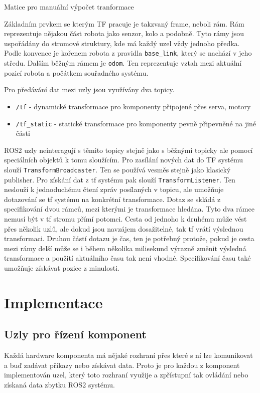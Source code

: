 \begin{center}
Matice pro manuální výpočet tranformace
\end{center}

Základním prvkem se kterým TF pracuje je takzvaný frame, neboli rám. Rám reprezentuje nějakou část robota jako senzor, kolo a podobně. Tyto rámy jsou uspořádány do stromové struktury, kde má každý uzel vždy jednoho předka. Podle konvence je kořenem robota z pravidla \verb|base_link|, který se nachází v jeho středu. Dalším běžným rámem je \verb|odom|. Ten reprezentuje vztah mezi aktuální pozicí robota a počátkem souřadného systému.

Pro předávání dat mezi uzly jsou využívány dva topicy.
\begin{itemize}
	\item {\verb|/tf| - dynamické transformace pro komponenty připojené přes serva, motory}
	\item {\verb|/tf_static| - statické transformace pro komponenty pevně připevněné na jiné části}
\end{itemize} 
ROS2 uzly neinteragují s těmito topicy stejně jako s běžnými topicky ale pomocí speciálních objektů k tomu sloužícím. Pro zasílání nových dat do TF systému slouží \verb|TransformBroadcaster|. Ten se používá vesměs stejně jako klasický publisher.
Pro získání dat z tf systému pak slouží \verb|TransformListener|. Ten neslouží k jednoduchému čtení zpráv posílaných v topicu, ale umožňuje dotazování se tf systému na konkrétní transformace. Dotaz se skládá z specifikování dvou rámců, mezi kterými je transformace hledána. Tyto dva rámce nemusí být v tf stromu přímí potomci. Cesta od jednoho k druhému může vést přes několik uzlů, ale dokud jsou navzájem dosažitelné, tak tf vrátí výslednou transformaci. Druhou částí dotazu je čas, ten je potřebný protože, pokud je cesta mezi rámy delší může se i během několika milisekund výrazně změnit výsledná transformace a použití aktuálního času tak není vhodné. Specifikování času také umožňuje získávat pozice z minulosti. 

\chapter{Implementace}


\section{Uzly pro řízení komponent}
Každá hardware komponenta má nějaké rozhraní přes které s ní lze komunikovat a buď zadávat příkazy nebo získávat data. Proto je pro každou z komponent implementován uzel, který toto rozhraní využije a zpřístupní tak ovládání nebo získaná data zbytku ROS2 systému.


